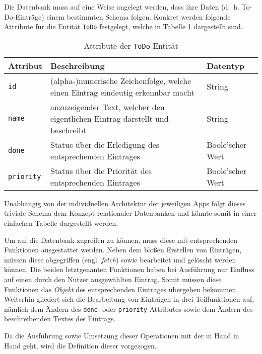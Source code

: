 Die Datenbank muss auf eine Weise angelegt werden, dass ihre Daten (d.\ h. To-Do-Einträge) einem bestimmten Schema folgen. Konkret werden folgende Attribute für die Entität \texttt{ToDo} festgelegt, welche in Tabelle \ref{tab:entity} dargestellt sind.

{\setlength{\extrarowheight}{3pt}%
\begin{table}[h!]
	\centering
	\begin{tabular}{l|p{9cm}|l}
		\textbf{Attribut} & \textbf{Beschreibung} & \textbf{Datentyp} \\ \hline 
		\texttt{id}          & (alpha-)numerische Zeichenfolge, welche einen Eintrag eindeutig erkennbar macht                    & String   \\
		\texttt{name}            & anzuzeigender Text, welcher den eigentlichen Eintrag darstellt und beschreibt                   & String                              \\
		\texttt{done}   & Status über die Erledigung des entsprechenden Eintrages                    & Boole'scher Wert \\
		\texttt{priority}   & Status über die Priorität des entsprechenden Eintrages                    & Boole'scher Wert \\                                  
	\end{tabular}
	\caption{Attribute der \texttt{ToDo}-Entität} \label{tab:entity}
\end{table}
}


Unabhängig von der individuellen Architektur der jeweiligen Apps folgt dieses triviale Schema dem Konzept relationaler Datenbanken und könnte somit in einer einfachen Tabelle dargestellt werden.

Um auf die Datenbank zugreifen zu können, muss diese mit entsprechenden Funktionen ausgestattet werden. Neben dem bloßen Erstellen von Einträgen, müssen diese abgegriffen (engl. \textit{fetch}) sowie bearbeitet und gelöscht werden können. Die beiden letztgenanten Funktionen haben bei Ausführung nur Einfluss auf einen durch den Nutzer ausgewählten Eintrag. Somit müssen diese Funktionen das \textit{Objekt} des entsprechenden Eintrages übergeben bekommen. Weiterhin gliedert sich die Bearbeitung von Einträgen in drei Teilfunktionen auf, nämlich dem Ändern des \texttt{done}- oder \texttt{priority}-Attributes sowie dem Ändern des beschreibenden Textes des Eintrags.

Da die Ausführung sowie Umsetzung dieser Operationen mit der \ac{ui} Hand in Hand geht, wird die Definition dieser vorgezogen.
